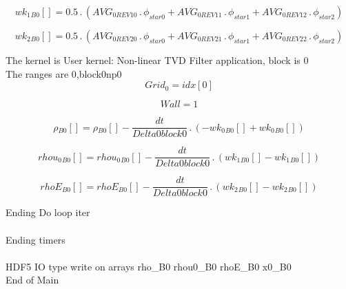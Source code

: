 \documentclass{article}
\begin{document}
\begin{dmath}{wk_{1}{_{B0}}}[{}] = 0.5 \,.\, \left(AVG_{0 REV 10} \,.\, \phi_{star 0} + AVG_{0 REV 11} \,.\, \phi_{star 1} + AVG_{0 REV 12} \,.\, \phi_{star 2}\right)\end{dmath}

\begin{dmath}{wk_{2}{_{B0}}}[{}] = 0.5 \,.\, \left(AVG_{0 REV 20} \,.\, \phi_{star 0} + AVG_{0 REV 21} \,.\, \phi_{star 1} + AVG_{0 REV 22} \,.\, \phi_{star 2}\right)\end{dmath}

\noindent The kernel is User kernel: Non-linear TVD Filter application, block is 0\\\noindent The ranges are 0,block0np0\\\begin{dmath}Grid_{0} = {idx}[{0}]\end{dmath}

\begin{dmath}Wall = 1\end{dmath}

\begin{dmath}{\rho{_{B0}}}[{}] = {\rho{_{B0}}}[{}] - \frac{dt}{Delta0block0} \,.\, \left(- {wk_{0}{_{B0}}}[{}] + {wk_{0}{_{B0}}}[{}]\right)\end{dmath}

\begin{dmath}{rhou_{0}{_{B0}}}[{}] = {rhou_{0}{_{B0}}}[{}] - \frac{dt}{Delta0block0} \,.\, \left({wk_{1}{_{B0}}}[{}] - {wk_{1}{_{B0}}}[{}]\right)\end{dmath}

\begin{dmath}{rhoE{_{B0}}}[{}] = {rhoE{_{B0}}}[{}] - \frac{dt}{Delta0block0} \,.\, \left({wk_{2}{_{B0}}}[{}] - {wk_{2}{_{B0}}}[{}]\right)\end{dmath}

\noindent Ending Do loop iter\\
\\\noindent Ending timers\\
\\\noindent HDF5 IO type write on arrays rho_B0 rhou0_B0 rhoE_B0 x0_B0\\\noindent End of Main\\
\end{document}
